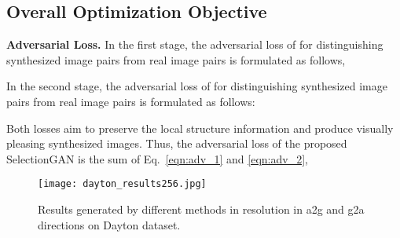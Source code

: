 \documentclass[10pt,twocolumn,letterpaper]{article}
\begin{document}
\subsection{Overall Optimization Objective}
\vspace{-0.2cm}
\noindent \textbf{Adversarial Loss.}
In the first stage, the adversarial loss of  for distinguishing synthesized image pairs  from real image pairs  is formulated as follows,
\vspace{-0.1cm}

In the second stage, the adversarial loss of  for distinguishing synthesized image pairs  from real image pairs  is formulated as follows:
\vspace{-0.1cm}

Both losses aim to preserve the local structure information and produce visually pleasing synthesized images.
Thus, the adversarial loss of the proposed SelectionGAN is the sum of Eq.~\eqref{eqn:adv_1} and  \eqref{eqn:adv_2},
\vspace{-0.1cm}


\begin{figure*}[!t] \small
	\centering
	\texttt{[image: dayton\_results256.jpg]}
	\caption{Results generated by different methods in  resolution in a2g and g2a directions on Dayton dataset.
	}
	\label{fig:day256}
	\vspace{-0.4cm}
\end{figure*}
\end{document}
